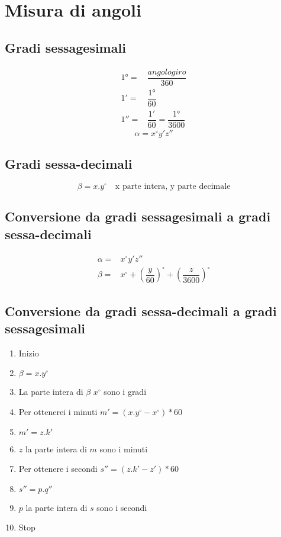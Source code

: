 \chapter{Misura di angoli}
\section{Gradi sessagesimali}
\begin{align}
\ang{1}=&\dfrac{angolo giro}{360}\\
\ang{;1;}=&\dfrac{\ang{1}}{60}\\
\ang{;;1}=&\dfrac{\ang{;1;}}{60}=\dfrac{\ang{1}}{3600}
\end{align}
\begin{equation}
\alpha=x^\circ y'z''
\end{equation}
\section{Gradi sessa-decimali}
\begin{equation}
\beta=x.y^\circ\quad\text{x parte intera, y parte decimale}
\end{equation}
\section{Conversione da gradi sessagesimali a gradi sessa-decimali}
\begin{align}
\alpha=&x^\circ y'z''\\
\beta=&x^\circ+\left(\dfrac{y}{60}\right)^\circ+\left(\dfrac{z}{3600}\right)^\circ
\end{align}
\section{Conversione da gradi sessa-decimali  a gradi sessagesimali}
\begin{enumerate}
	\item Inizio
	\item $\beta=x.y^\circ$
	\item La parte intera di $\beta$ $x^\circ$ sono i gradi
	\item Per ottenerei i minuti $m'=(x.y^\circ-x^\circ)*60$
	\item $m'=z.k'$
	\item $z$ la parte intera di $m$ sono i minuti 
	\item Per ottenere i secondi
	$s''=(z.k'-z')*60$ 
	\item $s''=p.q''$
	\item $p$ la parte intera di $s$ sono i secondi
	\item Stop
\end{enumerate}
